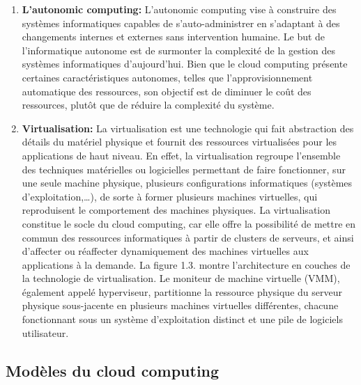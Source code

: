 \begin{enumerate}
\item \textbf{L'autonomic computing: }  L’autonomic computing  vise à construire des systèmes  informatiques capables de s’auto-administrer en s’adaptant à des changements  internes et externes sans intervention humaine. Le but de l'informatique autonome est de surmonter la complexité de la gestion des systèmes informatiques d'aujourd'hui. Bien que le cloud computing  présente certaines caractéristiques autonomes, telles que l’approvisionnement automatique des ressources, son objectif est de diminuer le coût des ressources, plutôt que de réduire la complexité du système.

\item \textbf{Virtualisation: } La virtualisation est une technologie qui fait abstraction des détails du matériel physique et fournit des ressources virtualisées pour les applications de haut niveau. En effet, la virtualisation regroupe l’ensemble des techniques matérielles ou logicielles permettant de faire fonctionner, sur une seule machine physique, plusieurs configurations informatiques (systèmes d’exploitation,…), de sorte à former plusieurs machines virtuelles, qui reproduisent le comportement des machines physiques. La virtualisation constitue le socle du cloud computing, car elle offre la possibilité de mettre en commun des ressources informatiques à partir de clusters de serveurs, et ainsi d’affecter ou réaffecter dynamiquement des machines virtuelles aux applications à la demande. La figure 1.3. montre l’architecture en couches de la technologie de virtualisation. Le moniteur de machine virtuelle (VMM), également appelé hyperviseur, partitionne la ressource physique du serveur physique sous-jacente en plusieurs machines virtuelles  différentes, chacune fonctionnant sous un système d'exploitation distinct et une pile de logiciels utilisateur. 
\end{enumerate}














\subsection{Modèles du cloud computing  }
